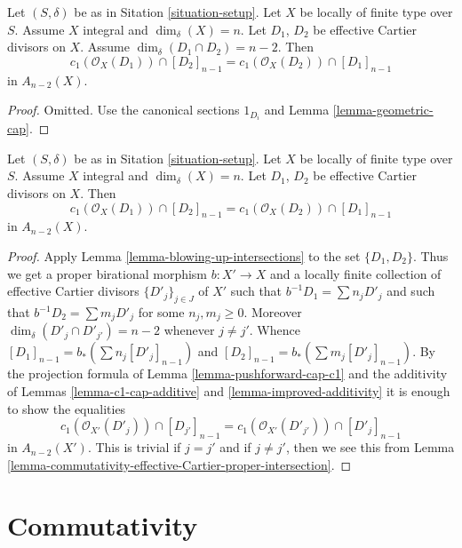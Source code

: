 \begin{lemma}
\label{lemma-commutativity-effective-Cartier-proper-intersection}
Let $(S, \delta)$ be as in Sitation \ref{situation-setup}.
Let $X$ be locally of finite type over $S$.
Assume $X$ integral and $\dim_\delta(X) = n$.
Let $D_1$, $D_2$ be effective Cartier divisors on $X$.
Assume $\dim_\delta(D_1 \cap D_2) = n - 2$. Then
$$
c_1(\mathcal{O}_X(D_1)) \cap [D_2]_{n - 1}
=
c_1(\mathcal{O}_X(D_2)) \cap [D_1]_{n - 1}
$$
in $A_{n - 2}(X)$.
\end{lemma}

\begin{proof}
Omitted. Use the canonical sections $1_{D_i}$ and
Lemma \ref{lemma-geometric-cap}.
\end{proof}

\begin{lemma}
\label{lemma-commutativity-effective-Cartier}
Let $(S, \delta)$ be as in Sitation \ref{situation-setup}.
Let $X$ be locally of finite type over $S$.
Assume $X$ integral and $\dim_\delta(X) = n$.
Let $D_1$, $D_2$ be effective Cartier divisors on $X$.
Then
$$
c_1(\mathcal{O}_X(D_1)) \cap [D_2]_{n - 1}
=
c_1(\mathcal{O}_X(D_2)) \cap [D_1]_{n - 1}
$$
in $A_{n - 2}(X)$.
\end{lemma}

\begin{proof}
Apply Lemma \ref{lemma-blowing-up-intersections} to the set $\{D_1, D_2\}$.
Thus we get a proper birational morphism $b : X' \to X$
and a locally finite collection of effective Cartier
divisors $\{D'_j\}_{j \in J}$ of $X'$ such that
$b^{-1}D_1 = \sum n_j D'_j$ and such that
$b^{-1}D_2 = \sum m_j D'_j$ for some $n_j, m_j \geq 0$.
Moreover $\dim_\delta(D'_j \cap D'_{j'}) = n - 2$ whenever
$j \not = j'$.
Whence $[D_1]_{n - 1} = b_* ( \sum n_j[D'_j]_{n - 1} )$
and $[D_2]_{n - 1} = b_* ( \sum m_j[D'_j]_{n - 1} )$.
By the projection formula of Lemma \ref{lemma-pushforward-cap-c1}
and the additivity of Lemmas \ref{lemma-c1-cap-additive}
and \ref{lemma-improved-additivity}
it is enough to show the equalities
$$
c_1(\mathcal{O}_{X'}(D'_j)) \cap [D_{j'}]_{n - 1}
=
c_1(\mathcal{O}_{X'}(D'_{j'})) \cap [D'_j]_{n - 1}
$$
in $A_{n - 2}(X')$. This is trivial if $j = j'$ and
if $j \not = j'$, then we see this from
Lemma \ref{lemma-commutativity-effective-Cartier-proper-intersection}.
\end{proof}








\section{Commutativity}
\label{section-commutativity}



